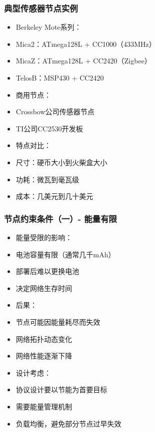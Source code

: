 \documentclass[aspectratio=43]{beamer}
\begin{document}
\begin{frame}
  \frametitle{典型传感器节点实例}

  \begin{itemize}
  \item<+-> Berkeley Mote系列：
  \item<+-> Mica2：ATmega128L + CC1000（433MHz）
  \item<+-> MicaZ：ATmega128L + CC2420（Zigbee）
  \item<+-> TelosB：MSP430 + CC2420
  \item<+-> 商用节点：
  \item<+-> Crossbow公司传感器节点
  \item<+-> TI公司CC2530开发板
  \item<+-> 特点对比：
  \item<+-> 尺寸：硬币大小到火柴盒大小
  \item<+-> 功耗：微瓦到毫瓦级
  \item<+-> 成本：几美元到几十美元
  \end{itemize}
\end{frame}

\begin{frame}
  \frametitle{节点约束条件（一）- 能量有限}

  \begin{itemize}
  \item<+-> 能量受限的影响：
  \item<+-> 电池容量有限（通常几千mAh）
  \item<+-> 部署后难以更换电池
  \item<+-> 决定网络生存时间
  \item<+-> 后果：
  \item<+-> 节点可能因能量耗尽而失效
  \item<+-> 网络拓扑动态变化
  \item<+-> 网络性能逐渐下降
  \item<+-> 设计考虑：
  \item<+-> 协议设计要以节能为首要目标
  \item<+-> 需要能量管理机制
  \item<+-> 负载均衡，避免部分节点过早失效
  \end{itemize}
\end{frame}
\end{document}
